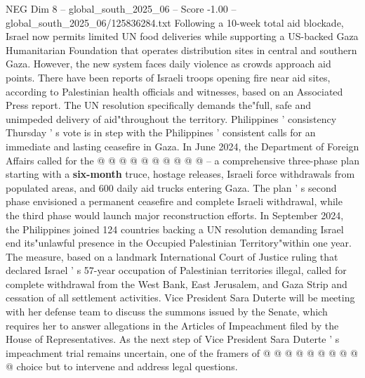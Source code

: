 \begin{textsample}{NEG Dim 8 – global\_south\_2025\_06 – Score -1.00 – global\_south\_2025\_06/125836284.txt}
Following a 10-week total aid blockade, Israel now permits limited UN food deliveries while supporting a US-backed Gaza Humanitarian Foundation that operates distribution sites in central and southern Gaza.
However, the new system faces daily violence as crowds approach aid points.
There have been reports of Israeli troops opening fire near aid sites, according to Palestinian health officials and witnesses, based on an Associated Press report.
The UN resolution specifically demands the"full, safe and unimpeded delivery of aid"throughout the territory.
Philippines ' consistency Thursday ' s vote is in step with the Philippines ' consistent calls for an immediate and lasting ceasefire in Gaza.
In June 2024, the Department of Foreign Affairs called for the @ @ @ @ @ @ @ @ @ @ -- a comprehensive three-phase plan starting with a \textbf{six-month} truce, hostage releases, Israeli force withdrawals from populated areas, and 600 daily aid trucks entering Gaza.
The plan ' s second phase envisioned a permanent ceasefire and complete Israeli withdrawal, while the third phase would launch major reconstruction efforts.
In September 2024, the Philippines joined 124 countries backing a UN resolution demanding Israel end its"unlawful presence in the Occupied Palestinian Territory"within one year.
The measure, based on a landmark International Court of Justice ruling that declared Israel ' s 57-year occupation of Palestinian territories illegal, called for complete withdrawal from the West Bank, East Jerusalem, and Gaza Strip and cessation of all settlement activities.
Vice President Sara Duterte will be meeting with her defense team to discuss the summons issued by the Senate, which requires her to answer allegations in the Articles of Impeachment filed by the House of Representatives.
As the next step of Vice President Sara Duterte ' s impeachment trial remains uncertain, one of the framers of @ @ @ @ @ @ @ @ @ @ choice but to intervene and address legal questions.

\end{textsample}
